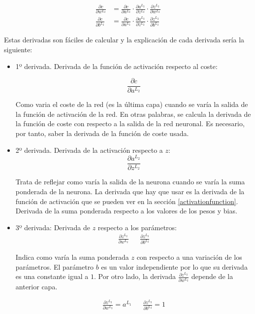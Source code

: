 \begin{equation}
\begin{split}
     \frac{\partial c}{\partial w^{L_2}} &= \frac{\partial c}{\partial a^{L_2}} \cdot \frac{\partial a^{L_2}}{\partial z^{L_2}} \cdot \frac{\partial z^{L_2}}{\partial w^{L_2}} \\
     \frac{\partial c}{\partial b^{L_2}} &= \frac{\partial c}{\partial a^{L_2}} \cdot \frac{\partial a^{L_2}}{\partial z^{L_2}} \cdot \frac{\partial z^{L_2}}{\partial b^{L_2}}
\end{split}
 \label{eqn:backpropagationlayer2}
\end{equation}

Estas derivadas son fáciles de calcular y la explicación de cada derivada sería la siguiente:

\begin{itemize}
\item 1º derivada. Derivada de la función de activación respecto al coste:

\begin{equation}
    \frac{\partial c}{\partial a^{L_2}}
\end{equation}

Como varia el coste de la red (es la última capa) cuando se varía la salida de la función de activación de la red. En otras palabras, se calcula la derivada de la función de coste con respecto a la salida de la red neuronal. Es necesario, por tanto, saber la derivada de la función de coste usada.

\item 2º derivada. Derivada de la activación respecto a $z$:
\begin{equation}
    \frac{\partial a^{L_2}}{\partial z^{L_2}}
\end{equation}

Trata de reflejar como varía la salida de la neurona cuando se varía la suma ponderada de la neurona. La derivada que hay que usar es la derivada de la función de activación que se pueden ver en la sección \ref{activationfunction}. Derivada de la suma ponderada respecto a los valores de los pesos y bias.

\item 3º derivada: Derivada de $z$ respecto a los parámetros:
\begin{align*}
    \frac{\partial z^{L_2}}{\partial w^{L_2}} && \frac{\partial z^{L_2}}{\partial b^{L_2}}
\end{align*}

Indica como varía la suma ponderada $z$ con respecto a una variación de los parámetros. El parámetro $b$ es un valor independiente por lo que su derivada es una constante igual a $1$. Por otro lado, la derivada $\frac{\partial z^{L_2}}{\partial w^{L_2}}$ depende de la anterior capa.

\begin{align*}
    \frac{\partial z^{L_2}}{\partial w^{L_2}} = a^{L_1} && \frac{\partial z^{L_2}}{\partial b^{L_2}} = 1
\end{align*}

\end{itemize}

